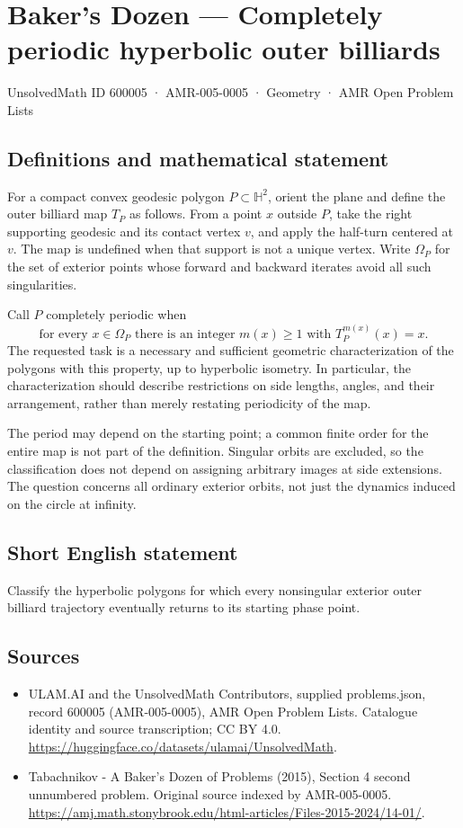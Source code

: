 \documentclass[11pt,a4paper]{article}
\begin{document}
\section*{Baker's Dozen — Completely periodic hyperbolic outer billiards}\label{600005}
{\small UnsolvedMath ID 600005 · AMR-005-0005 · Geometry · AMR Open Problem Lists}
\subsection{Definitions and mathematical statement}
For a compact convex geodesic polygon $P\subset\mathbb H^2$, orient the plane
and define the outer billiard map $T_P$ as follows. From a point $x$ outside
$P$, take the right supporting geodesic and its contact vertex $v$, and apply
the half-turn centered at $v$. The map is undefined when that support is
not a unique vertex. Write $\Omega_P$ for the set of exterior points whose
forward and backward iterates avoid all such singularities.

Call $P$ completely periodic when
\[
  \text{for every }x\in\Omega_P\text{ there is an integer }m(x)\ge1
  \text{ with }T_P^{m(x)}(x)=x.
\]
The requested task is a necessary and sufficient geometric characterization
of the polygons with this property, up to hyperbolic isometry. In particular,
the characterization should describe restrictions on side lengths, angles,
and their arrangement, rather than merely restating periodicity of the map.

The period may depend on the starting point; a common finite order for the
entire map is not part of the definition. Singular orbits are excluded, so
the classification does not depend on assigning arbitrary images at side
extensions. The question concerns all ordinary exterior orbits, not just
the dynamics induced on the circle at infinity.
\subsection{Short English statement}
Classify the hyperbolic polygons for which every nonsingular exterior
outer billiard trajectory eventually returns to its starting phase point.
\subsection{Sources}
\begin{itemize}
\item[S1] ULAM.AI and the UnsolvedMath Contributors, supplied problems.json, record 600005 (AMR-005-0005), AMR Open Problem Lists. Catalogue identity and source transcription; CC BY 4.0.
\url{https://huggingface.co/datasets/ulamai/UnsolvedMath}.
\item[S2] Tabachnikov - A Baker's Dozen of Problems (2015), Section 4 second unnumbered problem. Original source indexed by AMR-005-0005.
\url{https://amj.math.stonybrook.edu/html-articles/Files-2015-2024/14-01/}.
\end{itemize}
\end{document}
